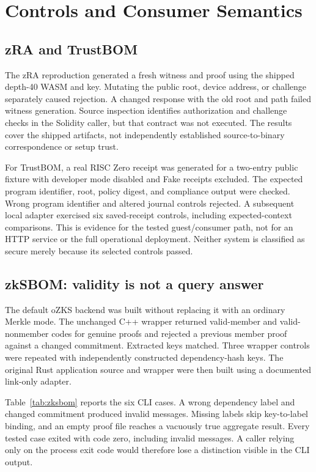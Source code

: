 \documentclass[sigconf,nonacm]{acmart}
\begin{document}
\section{Controls and Consumer Semantics}
\subsection{zRA and TrustBOM}
The zRA reproduction generated a fresh witness and proof using the shipped depth-40 WASM and key. Mutating the public root, device address, or challenge separately caused rejection. A changed response with the old root and path failed witness generation. Source inspection identifies authorization and challenge checks in the Solidity caller, but that contract was not executed. The results cover the shipped artifacts, not independently established source-to-binary correspondence or setup trust.

For TrustBOM, a real RISC Zero receipt was generated for a two-entry public fixture with developer mode disabled and Fake receipts excluded. The expected program identifier, root, policy digest, and compliance output were checked. Wrong program identifier and altered journal controls rejected. A subsequent local adapter exercised six saved-receipt controls, including expected-context comparisons. This is evidence for the tested guest/consumer path, not for an HTTP service or the full operational deployment. Neither system is classified as secure merely because its selected controls passed.

\subsection{zkSBOM: validity is not a query answer}
The default oZKS backend was built without replacing it with an ordinary Merkle mode. The unchanged C++ wrapper returned valid-member and valid-nonmember codes for genuine proofs and rejected a previous member proof against a changed commitment. Extracted keys matched. Three wrapper controls were repeated with independently constructed dependency-hash keys. The original Rust application source and wrapper were then built using a documented link-only adapter.

Table~\ref{tab:zksbom} reports the six CLI cases. A wrong dependency label and changed commitment produced invalid messages. Missing labels skip key-to-label binding, and an empty proof file reaches a vacuously true aggregate result. Every tested case exited with code zero, including invalid messages. A caller relying only on the process exit code would therefore lose a distinction visible in the CLI output.
\end{document}
